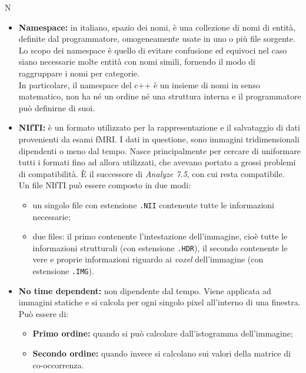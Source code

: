 \Huge N
\normalsize
\begin{itemize}
\item\textbf{Namespace:} in italiano, spazio dei nomi, è una collezione di nomi di entità, definite dal programmatore, omogeneamente usate in uno o più file sorgente. Lo scopo dei namespace è quello di evitare confusione ed equivoci nel caso siano necessarie molte entità con nomi simili, fornendo il modo di raggruppare i nomi per categorie.
\\In particolare, il namespace del c++ è un insieme di nomi in senso matematico, non ha né un ordine né una struttura interna e il programmatore può definirne di suoi.

\item\textbf{NIfTI:} è un formato utilizzato per la rappresentazione e il salvataggio di dati provenienti da esami fMRI\glossario{}. I dati in questione, sono immagini tridimensionali dipendenti o meno dal tempo. Nasce principalmente per cercare di uniformare tutti i formati fino ad allora utilizzati, che avevano portato a grossi problemi di compatibilità. \`E il successore di \textit{Analyze 7.5}\glossario{}, con cui resta compatibile.
\\Un file NIfTI\glossario{} può essere composto in due modi:
\begin{itemize}
\item un singolo file con estensione \verb!.NII! contenente tutte le informazioni necessarie;
\item due files: il primo contenente l'intestazione dell'immagine, cioè tutte le informazioni strutturali (con estensione \verb!.HDR!), il secondo contenente le vere e proprie informazioni riguardo ai \textit{voxel}\glossario{} dell'immagine (con estensione \verb!.IMG!). 
\end{itemize}

\item\textbf{No time dependent:} non dipendente dal tempo. Viene applicata ad immagini statiche e si calcola per ogni singolo pixel\glossario{} all'interno di una finestra. Può essere di:
\begin{itemize}
\item\textbf{Primo ordine:} quando si può calcolare dall'istogramma dell'immagine;
\item\textbf{Secondo ordine:} quando invece si calcolano sui valori della matrice di co-occorrenza\glossario{}.
\end{itemize}

\end{itemize}
\pagebreak


